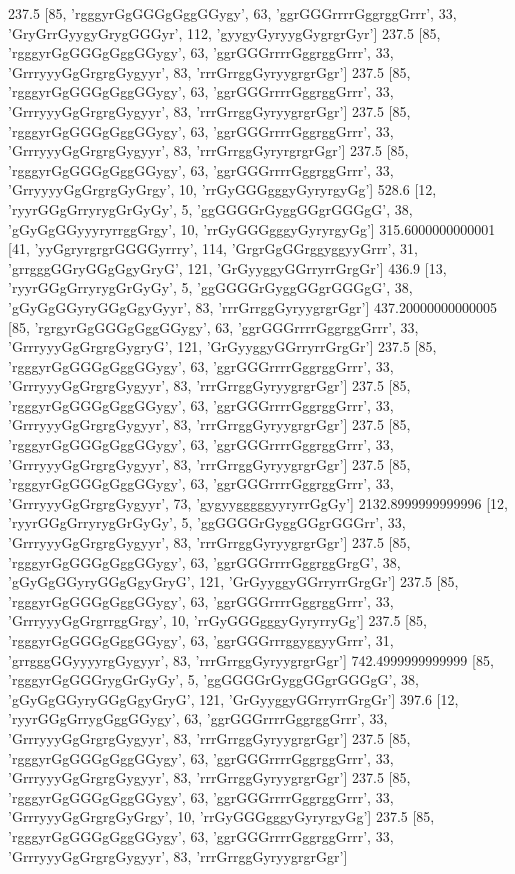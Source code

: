 237.5 [85, 'rgggyrGgGGGgGggGGygy', 63, 'ggrGGGrrrrGggrggGrrr', 33, 'GryGrrGyygyGrygGGGyr', 112, 'gyygyGyryygGygrgrGyr']
237.5 [85, 'rgggyrGgGGGgGggGGygy', 63, 'ggrGGGrrrrGggrggGrrr', 33, 'GrrryyyGgGrgrgGygyyr', 83, 'rrrGrrggGyryygrgrGgr']
237.5 [85, 'rgggyrGgGGGgGggGGygy', 63, 'ggrGGGrrrrGggrggGrrr', 33, 'GrrryyyGgGrgrgGygyyr', 83, 'rrrGrrggGyryygrgrGgr']
237.5 [85, 'rgggyrGgGGGgGggGGygy', 63, 'ggrGGGrrrrGggrggGrrr', 33, 'GrrryyyGgGrgrgGygyyr', 83, 'rrrGrrggGyryrgrgrGgr']
237.5 [85, 'rgggyrGgGGGgGggGGygy', 63, 'ggrGGGrrrrGggrggGrrr', 33, 'GrryyyyGgGrgrgGyGrgy', 10, 'rrGyGGGgggyGyryrgyGg']
528.6 [12, 'ryyrGGgGrryrygGrGyGy', 5, 'ggGGGGrGyggGGgrGGGgG', 38, 'gGyGgGGyyyryrrggGrgy', 10, 'rrGyGGGgggyGyryrgyGg']
315.6000000000001 [41, 'yyGgryrgrgrGGGGyrrry', 114, 'GrgrGgGGrggyggyyGrrr', 31, 'grrgggGGryGGgGgyGryG', 121, 'GrGyyggyGGrryrrGrgGr']
436.9 [13, 'ryyrGGgGrryrygGrGyGy', 5, 'ggGGGGrGyggGGgrGGGgG', 38, 'gGyGgGGyryGGgGgyGyyr', 83, 'rrrGrrggGyryygrgrGgr']
437.20000000000005 [85, 'rgrgyrGgGGGgGggGGygy', 63, 'ggrGGGrrrrGggrggGrrr', 33, 'GrrryyyGgGrgrgGygryG', 121, 'GrGyyggyGGrryrrGrgGr']
237.5 [85, 'rgggyrGgGGGgGggGGygy', 63, 'ggrGGGrrrrGggrggGrrr', 33, 'GrrryyyGgGrgrgGygyyr', 83, 'rrrGrrggGyryygrgrGgr']
237.5 [85, 'rgggyrGgGGGgGggGGygy', 63, 'ggrGGGrrrrGggrggGrrr', 33, 'GrrryyyGgGrgrgGygyyr', 83, 'rrrGrrggGyryygrgrGgr']
237.5 [85, 'rgggyrGgGGGgGggGGygy', 63, 'ggrGGGrrrrGggrggGrrr', 33, 'GrrryyyGgGrgrgGygyyr', 83, 'rrrGrrggGyryygrgrGgr']
237.5 [85, 'rgggyrGgGGGgGggGGygy', 63, 'ggrGGGrrrrGggrggGrrr', 33, 'GrrryyyGgGrgrgGygyyr', 73, 'gygyygggggyyryrrGgGy']
2132.8999999999996 [12, 'ryyrGGgGrryrygGrGyGy', 5, 'ggGGGGrGyggGGgrGGGrr', 33, 'GrrryyyGgGrgrgGygyyr', 83, 'rrrGrrggGyryygrgrGgr']
237.5 [85, 'rgggyrGgGGGgGggGGygy', 63, 'ggrGGGrrrrGggrggGrgG', 38, 'gGyGgGGyryGGgGgyGryG', 121, 'GrGyyggyGGrryrrGrgGr']
237.5 [85, 'rgggyrGgGGGgGggGGygy', 63, 'ggrGGGrrrrGggrggGrrr', 33, 'GrrryyyGgGrgrrggGrgy', 10, 'rrGyGGGgggyGyryrryGg']
237.5 [85, 'rgggyrGgGGGgGggGGygy', 63, 'ggrGGGrrrggyggyyGrrr', 31, 'grrgggGGyyyyrgGygyyr', 83, 'rrrGrrggGyryygrgrGgr']
742.4999999999999 [85, 'rgggyrGgGGGrygGrGyGy', 5, 'ggGGGGrGyggGGgrGGGgG', 38, 'gGyGgGGyryGGgGgyGryG', 121, 'GrGyyggyGGrryrrGrgGr']
397.6 [12, 'ryyrGGgGrrygGggGGygy', 63, 'ggrGGGrrrrGggrggGrrr', 33, 'GrrryyyGgGrgrgGygyyr', 83, 'rrrGrrggGyryygrgrGgr']
237.5 [85, 'rgggyrGgGGGgGggGGygy', 63, 'ggrGGGrrrrGggrggGrrr', 33, 'GrrryyyGgGrgrgGygyyr', 83, 'rrrGrrggGyryygrgrGgr']
237.5 [85, 'rgggyrGgGGGgGggGGygy', 63, 'ggrGGGrrrrGggrggGrrr', 33, 'GrrryyyGgGrgrgGyGrgy', 10, 'rrGyGGGgggyGyryrgyGg']
237.5 [85, 'rgggyrGgGGGgGggGGygy', 63, 'ggrGGGrrrrGggrggGrrr', 33, 'GrrryyyGgGrgrgGygyyr', 83, 'rrrGrrggGyryygrgrGgr']
